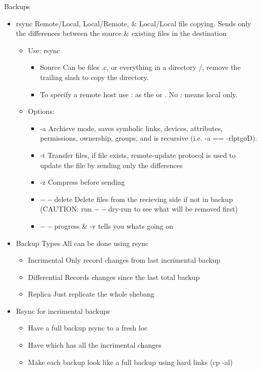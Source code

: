 \documentclass{notes}
\begin{document}
\begin{questions}{Backups}
	\begin{itemize}
		\item rsync \ra Remote/Local, Local/Remote, \& Local/Local file copying. Sends only the differences between the source \& existing files in the destination
			\begin{itemize}
				\item Use: rsync   
					\begin{itemize}
						\item Source \ra Can be files \ra *.c, or everything in a directory /, remove the trailing slash to copy the directory.
						\item To specify a remote host \opt{computer name} use \ra {}: as the  or . No : means local only.
					\end{itemize}
				\item Options:
					\begin{itemize}
						\item -a \ra Archieve mode, saves symbolic links, devices, attributes, permissions, ownership, groups, and is recursive (i.e. -a == -rlptgoD).
						\item -t \ra Transfer files, if file exists, remote-update protocol is used to update the file by sending only the differences
						\item -z \ra Compress before sending
						\item $--$delete \ra Delete files from the recieving side if not in backup (CAUTION: run $--$dry-run to see what will be removed first)
						\item $--$progress \& -v tells you whats going on
					\end{itemize}
			\end{itemize}
		\item Backup Types \ra All can be done using rsync
			\begin{itemize}
				\item Incrimental \ra Only record changes from last incrimental backup
				\item Differential \ra Records changes since the last total backup
				\item Replica \ra Just replicate the whole shebang
			\end{itemize}
		\item Rsync for incrimental backups
			\begin{itemize}
				\item Have a full backup  \ra rsync to a fresh loc
				\item Have  which has all the incrimental changes
				\item Make each backup look like a full backup using hard links (cp -al)
			\end{itemize}
	\end{itemize}
\end{questions}
\end{document}
